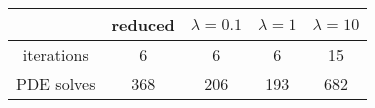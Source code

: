 \begin{tabular}{ccccc}
& reduced & $\lambda = 0.1$ & $\lambda = 1$ & $\lambda = 10$ \\
\hline
iterations & 6 & 6 & 6 & 15 \\
PDE solves & 368 & 206 & 193 & 682 \\
\hline
\end{tabular}
